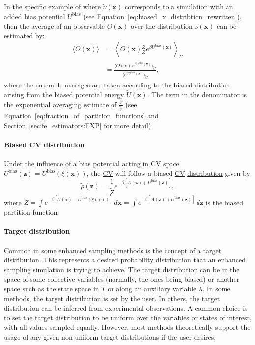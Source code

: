 \documentclass[9pt,review]{livecoms}
\newcommand{\vx}{\mathbf{x}}
\newcommand{\vz}{\mathbf{z}}
\begin{document}
In the specific example of where $\tilde \nu(\vx)$ corresponds to a simulation with an added bias potential $U^{\mathrm{bias}}$ (see Equation~\ref{eq:biased_x_distribtion_rewritten}), then the average of an observable $O(\vx)$ over the distribution $\nu(\vx)$ can be estimated by:
\begin{align}
\label{eq:reweighting_bias_potential}
\langle O(\vx) \rangle &= \left \langle O(\vx) \frac{\tilde{Z}}{Z}e^{\beta U^\mathrm{bias}(\vx)} \right \rangle_{\tilde U} \nonumber  \\
 &= \frac{\langle O(\vx) \, e^{\beta U^\mathrm{bias}(\vx)} \rangle_{\tilde U}}
{\langle e^{\beta U^\mathrm{bias}(\vx)} \rangle_{\tilde U}},
\end{align}
where the \hyperlink{ref:ensemble_average} {ensemble average}s are taken according to the \hyperlink{ref:BiasedDist} {biased distribution} arising from the biased potential energy $\tilde U(\vx)$. The term in the denominator is the exponential averaging estimate of $\frac{Z}{\tilde Z}$ (see Equation~\ref{eq:fraction_of_partition_functions} and Section~\ref{sec:fe_estimators:EXP} for more detail).

\hypertarget{ref:BiasedCVDist} {\paragraph{Biased CV distribution}}
Under the influence of a bias potential acting in \hyperlink{ref:CV} {CV} space $U^\mathrm{bias}(\vz)=U^\mathrm{bias}(\xi(\vx))$, the \hyperlink{ref:CV} {CV} will follow a biased \hyperlink{ref:CV} {CV} \hyperlink{ref:Distribution} {distribution} given by
\begin{equation}
\label{eq:BiasedCVDistrib}
\tilde \rho(\vz) = \frac{1}{\tilde{Z}}
e^{-\beta \left[
A(\vz) + U^\mathrm{bias}(\vz)
\right]},
\end{equation}
where $\tilde{Z} = \int e^{-\beta\left [ U(\vx) + U^\mathrm{bias}(\xi(\vx)) \right]} \, d\vx = \int e^{-\beta\left [ A(\vz) + U^\mathrm{bias}(\vz) \right]} \, d\vz$ is the biased partition function.

\hypertarget{ref:targetdist}{\paragraph{Target distribution}}
Common in some enhanced sampling methods is the concept of a target distribution. This represents a desired probability \hyperlink{ref:Distribution} {distribution} that an enhanced sampling simulation is trying to achieve. The target distribution can be in the space of some collective variables (normally, the ones being biased) or another space such as the state space in $T$ or along an auxiliary variable $\lambda$. In some methods, the target distribution is set by the user. In others, the target distribution can be inferred from experimental observations. A common choice is to set the target distribution to be uniform over the variables or states of interest, with all values sampled equally. However, most methods theoretically support the usage of any given non-uniform target distributions if the user desires.
\end{document}
